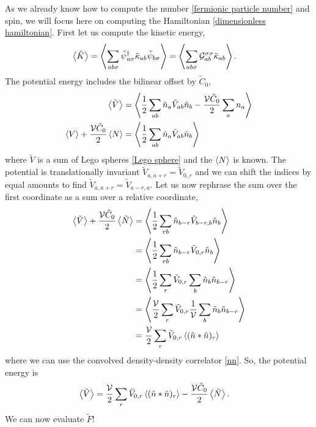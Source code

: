 As we already know how to compute the number \eqref{fermionic particle number} and spin, we will focus here on computing the Hamiltonian \eqref{dimensionless hamiltonian}.
First let us compute the kinetic energy,
\begin{align}
	\left\langle \tilde{K} \right\rangle
	&=
	\left\langle  \sum_{ab\sigma} \tilde{\psi}{}^{\dagger}_{a\sigma} \tilde{\kappa}_{ab} \tilde{\psi}_{b\sigma}  \right\rangle
	=
	\left\langle  \sum_{ab\sigma} \mathcal{G}^{\sigma \sigma}_{ab} \tilde{\kappa}_{ab}  \right\rangle.
\end{align}
The potential energy includes the bilinear offset by $\tilde{C}_0$,
\begin{align}
	\left\langle \tilde{V} \right\rangle
	&=
	\left\langle  \frac{1}{2} \sum_{ab} \tilde{n}_a \tilde{V}_{ab} \tilde{n}_b - \frac{\mathcal{V} \tilde{C}_0}{2}\sum_{a} n_a  \right\rangle
	\nonumber\\
	\left\langle V \right\rangle
	+ \frac{\mathcal{V} \tilde{C}_0}{2} \left\langle N \right\rangle
	&=
	\left\langle  \frac{1}{2} \sum_{ab} \tilde{n}_a \tilde{V}_{ab} \tilde{n}_b  \right\rangle
\end{align}
where $\tilde{V}$ is a sum of Lego spheres \eqref{Lego sphere} and the $\left\langle N \right\rangle$ is known.
The potential is translationally invariant $\tilde{V}_{a,a+r} = \tilde{V}_{0,r}$ and we can shift the indices by equal amounts to find $\tilde{V}_{a,a+r}=\tilde{V}_{a-r,a}$.
Let us now rephrase the sum over the first coordinate as a sum over a relative coordinate,
\begin{align}
	\left\langle \tilde{V} \right\rangle
	+ \frac{\mathcal{V} \tilde{C}_0}{2} \left\langle \tilde{N} \right\rangle
	&=
	\left\langle  \frac{1}{2} \sum_{rb} \tilde{n}_{b-r} \tilde{V}_{b-r,b} \tilde{n}_b  \right\rangle
	\nonumber\\
	&=
	\left\langle  \frac{1}{2} \sum_{rb} \tilde{n}_{b-r} \tilde{V}_{0,r} \tilde{n}_b  \right\rangle
	\nonumber\\
	&=
	\left\langle  \frac{1}{2} \sum_{r} \tilde{V}_{0,r} \sum_b \tilde{n}_b \tilde{n}_{b-r}  \right\rangle
	\nonumber\\
	&=
	\left\langle  \frac{\mathcal{V}}{2} \sum_{r} \tilde{V}_{0,r} \frac{1}{\mathcal{V}} \sum_b \tilde{n}_b \tilde{n}_{b-r}  \right\rangle
	\nonumber\\
	&=
	\frac{\mathcal{V}}{2} \sum_{r} \tilde{V}_{0,r} \left\langle  (\tilde{n}*\tilde{n})_r  \right\rangle
\end{align}
where we can use the convolved density-density correlator \eqref{nn}.
So, the potential energy is
\begin{align}
	\left\langle \tilde{V} \right\rangle
	&=
	\frac{\mathcal{V}}{2} \sum_{r} \tilde{V}_{0,r} \left\langle  (\tilde{n}*\tilde{n})_r  \right\rangle
	- \frac{\mathcal{V} \tilde{C}_0}{2} \left\langle \tilde{N} \right\rangle.
\end{align}
We can now evaluate $\tilde{F}$!

